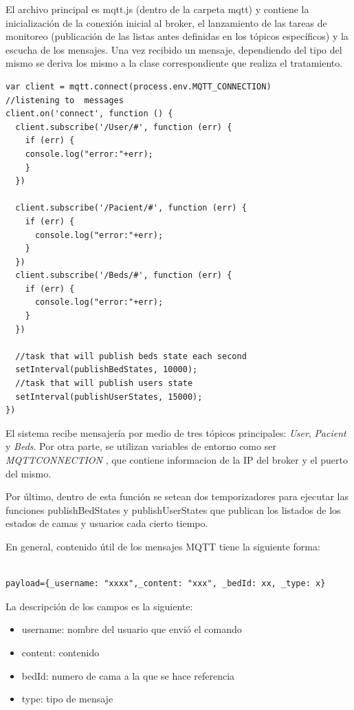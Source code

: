 El archivo principal es mqtt.js (dentro de la carpeta mqtt) y contiene la inicialización de la conexión inicial al broker, el lanzamiento de las tareas de monitoreo (publicación de las listas antes definidas en los tópicos específicos) y la escucha de los mensajes. Una vez recibido un mensaje, dependiendo del tipo del mismo se deriva los mismo a la clase correspondiente que realiza el tratamiento.



\begin{lstlisting}[caption=  Tareas ejecutadas por mqtt.js]
var client = mqtt.connect(process.env.MQTT_CONNECTION)
//listening to  messages
client.on('connect', function () {
  client.subscribe('/User/#', function (err) {
    if (err) {
    console.log("error:"+err);
    }
  })

  client.subscribe('/Pacient/#', function (err) {
    if (err) {      
      console.log("error:"+err);
    }
  })
  client.subscribe('/Beds/#', function (err) {
    if (err) {      
      console.log("error:"+err);
    }
  })

  //task that will publish beds state each second
  setInterval(publishBedStates, 10000);
  //task that will publish users state 
  setInterval(publishUserStates, 15000);
})
\end{lstlisting}

El sistema recibe mensajería por medio de tres tópicos principales: \textit{User}, \textit{Pacient} y \textit{Beds}. Por otra parte, se utilizan variables de entorno como ser \textit{MQTT\textunderscore CONNECTION}  , que contiene informacion de la IP del broker y el puerto del mismo.

Por último, dentro de esta función se setean dos temporizadores para ejecutar las funciones publishBedStates y publishUserStates que publican los listados de los estados de camas y usuarios cada cierto tiempo.




En general, contenido útil de los mensajes MQTT tiene la siguiente forma:

\begin{lstlisting}[caption=  Formato mensaje MQTT]

payload={_username: "xxxx",_content: "xxx", _bedId: xx, _type: x}

\end{lstlisting}

La descripción de los campos es la siguiente:
\begin{itemize}
\item \textunderscore username: nombre del usuario que envió el comando
\item \textunderscore content: contenido
\item \textunderscore bedId: numero de cama a la que se hace referencia
\item \textunderscore type: tipo de mensaje
\end{itemize}


